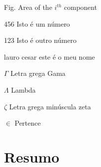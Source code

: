 \documentclass[
	12pt,				%
	openright,			%
	twoside,			%
	a4paper,			%
	english,			%
	french,				%
	spanish,			%
	brazil,				%
	]{abntex2}
\begin{document}
\frenchspacing 


\imprimircapa

\imprimirfolhaderosto


\listoffigures*
\cleardoublepage

\listoftables*
\cleardoublepage

\begin{siglas}
  \item[Fig.] Area of the $i^{th}$ component
  \item[456] Isto é um número
  \item[123] Isto é outro número
  \item[lauro cesar] este é o meu nome
\end{siglas}

\begin{simbolos}
  \item[$ \Gamma $] Letra grega Gama
  \item[$ \Lambda $] Lambda
  \item[$ \zeta $] Letra grega minúscula zeta
  \item[$ \in $] Pertence
\end{simbolos}

\tableofcontents*
\cleardoublepage


\textual

\chapter*[Resumo]{Resumo}
\end{document}
